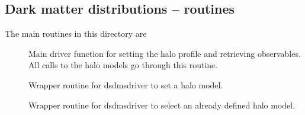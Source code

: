 
\subsection{Dark matter distributions -- routines}

The main routines in this directory are

\begin{description}
\item[]  Main driver function for setting the halo profile and retrieving observables. All calls to the halo
  models go through this routine.
\item[]  Wrapper routine for dsdmsdriver to set a halo model.
\item[]  Wrapper routine for dsdmsdriver to select an already defined halo model.
\end{description}

